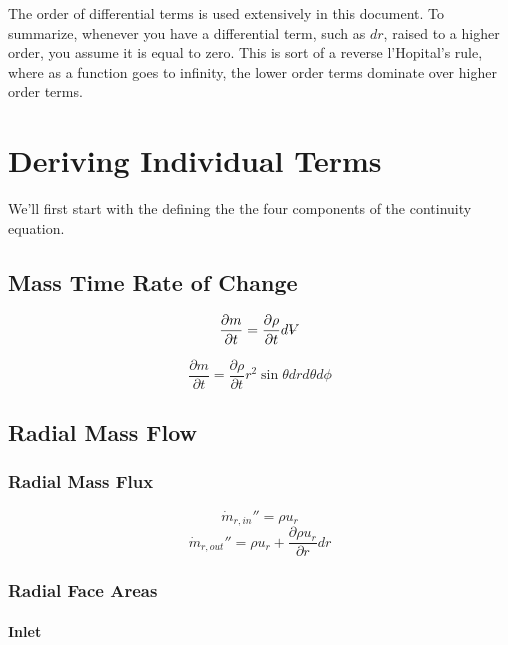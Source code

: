 \documentclass[12pt, letterpaper, twoside]{article}
\makeatletter
\DeclareRobustCommand{\volume}{\text{\volumedash}V}
\newcommand{\volumedash}{%
  \makebox[0pt][l]{%
    \ooalign{\hfil\hphantom{$\m@th V$}\hfil\cr\kern0.08em--\hfil\cr}%
  }%
}
\makeatother
\begin{document}
The order of differential terms is used extensively in this document. To summarize, whenever you have a differential term, such as \(dr\), raised to a higher order, you assume it is equal to zero. This is sort of a reverse l'Hopital's rule, where as a function goes to infinity, the lower order terms dominate over higher order terms.

\section{Deriving Individual Terms} \label{sect:deriveterms}
We'll first start with the defining the the four components of the continuity equation.

    \subsection{Mass Time Rate of Change}
        \begin{equation*}
            \frac{\partial m}{\partial t} = \frac{\partial \rho}{\partial t}d\volume
        \end{equation*}

        \begin{equation}
            \frac{\partial m}{\partial t} = 
            \frac{\partial \rho}{\partial t} r^2 \sin\theta dr d\theta d\phi
            \label{eq:dm/dt}
        \end{equation}

    \subsection{Radial Mass Flow}
        \subsubsection{Radial Mass Flux}
            \begin{equation}
                \dot{m}_{r,in}'' = \rho u_r
            \end{equation}
            \begin{equation}
                \dot{m}_{r,out}'' = \rho u_r  +
                \frac{\partial \rho u_r}{\partial r} dr
            \end{equation}

        \subsubsection{Radial Face Areas}
        \paragraph{Inlet}
\end{document}
